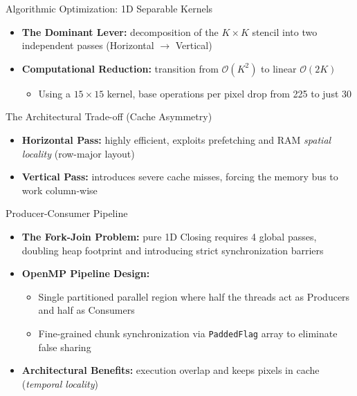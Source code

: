 \documentclass{beamer}
\begin{document}
\begin{frame}{Algorithmic Optimization: 1D Separable Kernels}
  \begin{itemize}
    \item \textbf{The Dominant Lever:} decomposition of the $K \times K$ stencil into two independent passes (Horizontal $\rightarrow$ Vertical)
    \item \textbf{Computational Reduction:} transition from $\mathcal{O}(K^2)$ to linear $\mathcal{O}(2K)$
      \begin{itemize}
        \item Using a $15 \times 15$ kernel, base operations per pixel drop from 225 to just 30
      \end{itemize}
  \end{itemize}
  
  \begin{block}{The Architectural Trade-off (Cache Asymmetry)}
    \begin{itemize}
      \item \textbf{Horizontal Pass:} highly efficient, exploits prefetching and RAM \textit{spatial locality} (row-major layout)
      \item \textbf{Vertical Pass:} introduces severe cache misses, forcing the memory bus to work column-wise
    \end{itemize}
  \end{block}
\end{frame}

\begin{frame}{Producer-Consumer Pipeline}
  \begin{itemize}
    \item \textbf{The Fork-Join Problem:} pure 1D Closing requires 4 global passes, doubling heap footprint and introducing strict synchronization barriers
    \item \textbf{OpenMP Pipeline Design:} 
      \begin{itemize}
        \item Single partitioned parallel region where half the threads act as Producers and half as Consumers
        \item Fine-grained chunk synchronization via \texttt{PaddedFlag} array to eliminate false sharing
      \end{itemize}
    \item \textbf{Architectural Benefits:} execution overlap and keeps pixels in cache (\textit{temporal locality})
  \end{itemize}
\end{frame}
\end{document}
